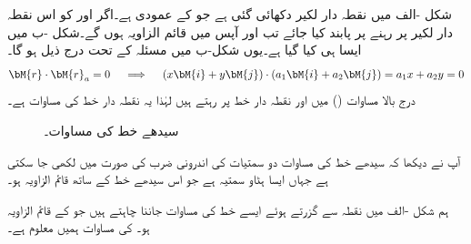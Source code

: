 شکل -الف میں نقطہ دار لکیر دکھائی گئی ہے جو  کے عمودی ہے۔اگر  اور  کو اس نقطہ دار لکیر پر رہنے پر پابند کیا جائے تب  اور  آپس میں قائم الزاویہ ہوں گے۔شکل -ب میں ایسا ہی کیا گیا ہے۔یوں شکل-ب میں مسئلہ  کے تحت درج ذیل ہو گا۔
\begin{align}\label{مساوات_الجبرا_سیدھا_خط_اندرونی_ضرب_الف}
\bM{r}\cdot \bM{r}_a=0\quad \implies \quad  (x\bM{i}+y\bM{j})\cdot(a_1\bM{i}+a_2\bM{j})=a_1x+a_2y=0
\end{align}
 درج بالا مساوات () میں  اور  نقطہ دار خط پر رہتے ہیں لہٰذا یہ نقطہ دار خط کی مساوات ہے۔
\begin{figure}
\centering
\begin{subfigure}{0.45\textwidth}
\centering
{}
\caption{}
\end{subfigure}\hfill
\begin{subfigure}{0.45\textwidth}
\centering
{}
\caption{}
\end{subfigure}
\caption{سیدھے خط کی مساوات۔}
\label{شکل_سیدھے_خط_کی_عمومی_مساوات}
\end{figure}

آپ نے دیکھا کہ سیدھے خط کی مساوات دو سمتیات کی اندرونی ضرب  کی صورت میں لکھی جا سکتی ہے جہاں  ایسا ہٹاو سمتیہ ہے جو اس سیدھے خط کے ساتھ قائم الزاویہ ہو۔

 ہم شکل -الف میں نقطہ  سے گزرتے ہوئے ایسے خط  کی مساوات جاننا چاہتے ہیں جو  کے  قائم الزاویہ ہو۔ کی مساوات ہمیں معلوم  ہے۔

